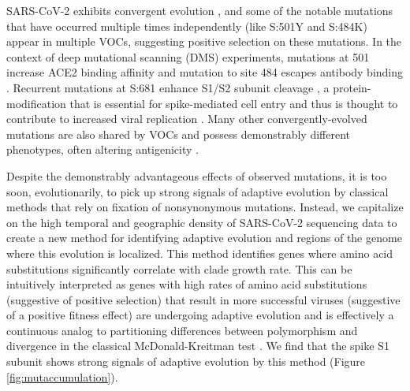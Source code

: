 \documentclass[11pt,oneside,letterpaper]{article}
\begin{document}
SARS-CoV-2 exhibits convergent evolution \cite{Van_Dorp2020-ox, Martin2021-lj, Rochman2021-sv}, and some of the notable mutations that have occurred multiple times independently (like S:501Y and S:484K) appear in multiple VOCs, suggesting positive selection on these mutations.
In the context of deep mutational scanning (DMS) experiments, mutations at 501 increase ACE2 binding affinity \cite{Starr2020-bt} and mutation to site 484 escapes antibody binding \cite{Greaney2021-jn}.
Recurrent mutations at S:681 enhance S1/S2 subunit cleavage \cite{Lubinski2021-ul, Liu2021-ne}, a protein-modification that is essential for spike-mediated cell entry \cite{Hoffmann2020-vi} and thus is thought to contribute to increased viral replication \cite{Liu2021-ne}.
Many other convergently-evolved mutations are also shared by VOCs and possess demonstrably different phenotypes, often altering antigenicity \cite{Li2020-jd, McCarthy2021-lg, Wang2021-dm}.

Despite the demonstrably advantageous effects of observed mutations, it is too soon, evolutionarily, to pick up strong signals of adaptive evolution by classical methods that rely on fixation of nonsynonymous mutations.
Instead, we capitalize on the high temporal and geographic density of SARS-CoV-2 sequencing data to create a new method for identifying adaptive evolution and regions of the genome where this evolution is localized.
This method identifies genes where amino acid substitutions significantly correlate with clade growth rate.
This can be intuitively interpreted as genes with high rates of amino acid substitutions (suggestive of positive selection) that result in more successful viruses (suggestive of a positive fitness effect) are undergoing adaptive evolution and is effectively a continuous analog to partitioning differences between polymorphism and divergence in the classical McDonald-Kreitman test \cite{mcdonald1991adaptive}.
We find that the spike S1 subunit shows strong signals of adaptive evolution by this method (Figure \ref{fig:mutaccumulation}).
\end{document}
